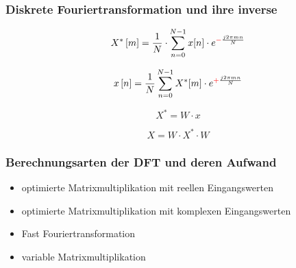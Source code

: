 \begin{frame}\frametitle{Diskrete Fouriertransformation und ihre inverse}


\medskip \medskip \medskip

\begin{equation*}\label{eq:dft}
 X^* \left[ m \right] = \frac{1}{N} \cdot \sum^{N-1}_{n=0} x[n] \cdot e^{\textcolor{red}{-}\frac{j 2 \pi m n}{N}}
\end{equation*}

\medskip

\begin{equation*}\label{eq:idft}
 x \left[ n \right] = \frac{1}{N} \sum^{N-1}_{n=0} X^*[m] \cdot e^{\textcolor{red}{+}\frac{j 2 \pi m n}{N}}
\end{equation*}

\medskip
 \begin{equation*}\label{eq:1D-DFT_MatrixMult}
X^* = W \cdot x
\end{equation*}

\medskip

\begin{equation*}
 X = W \cdot X^* \cdot W
\end{equation*}

 
\end{frame}



\begin{frame}\frametitle{Berechnungsarten der DFT und deren Aufwand}
 \begin{itemize}
  \item optimierte Matrixmultiplikation mit reellen Eingangswerten
  \item optimierte Matrixmultiplikation mit komplexen Eingangswerten
  \item Fast Fouriertransformation
  \item variable Matrixmultiplikation
 \end{itemize}
\end{frame}



